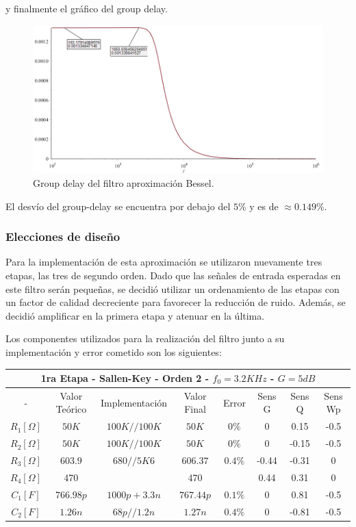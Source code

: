 y finalmente el gráfico del group delay.

\begin{figure}[H]
\centering
	\centering
	\includegraphics[width=\textwidth]{Imagenes-Ej1/groupdelay_calc.png}
	\caption{Group delay del filtro aproximación Bessel.}
	\label{bes_group_calc}
\end{figure}

El desvío del group-delay se encuentra por debajo del $5\%$ y es de $\approx 0.149\%$.

\subsubsection{Elecciones de diseño}

Para la implementación de esta aproximación se utilizaron nuevamente tres etapas, las tres de segundo orden. Dado que las señales de entrada esperadas en este filtro serán pequeñas, se decidió utilizar un ordenamiento de las etapas con un factor de calidad decreciente para favorecer la reducción de ruido. Además, se decidió amplificar en la primera etapa y atenuar en la última.

Los componentes utilizados para la realización del filtro junto a su implementación y error cometido son los siguientes:

\begin{table}[H]
\centering
\begin{tabular}{@{}cccccccc@{}}
\multicolumn{8}{c}{1ra Etapa - Sallen-Key - Orden 2 - $f_0 = 3.2KHz$ - $G=5dB$} \\ \midrule
- & Valor Teórico & Implementación & Valor Final & Error & Sens G & Sens Q & Sens Wp \\ \midrule
$R_1 [\Omega]$ & $50K$ & $100K//100K$ & $50K$ & $0\%$ & 0 & 0.15 & -0.5 \\
$R_2 [\Omega]$ & $50K$ & $100K//100K$ & $50K$ & $0\%$ & 0 & -0.15 & -0.5 \\
$R_3 [\Omega]$ & $603.9$ & $680//5K6$ & $606.37$ & $0.4\%$ & -0.44 & -0.31 & 0 \\
$R_4 [\Omega]$ & $470$ &  & $470$ &  & 0.44 & 0.31 & 0 \\
$C_1 [F]$ & $766.98p$ & $1000p+3.3n$ & $767.44p$ & $0.1\%$ & 0 & 0.81 & -0.5 \\
$C_2 [F]$ & $1.26n$ & $68p//1.2n$ & $1.27n$ & $0.4\%$ & 0 & -0.81 & -0.5 \\ \bottomrule
\end{tabular}
\end{table}

